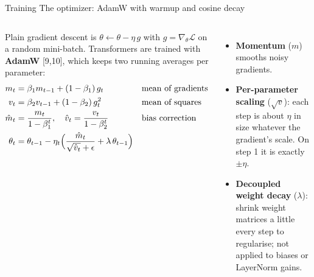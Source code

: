 \documentclass[aspectratio=169,10pt]{beamer}
\renewcommand{\cite}[1]{{\scriptsize\color{cTok}[#1]}}
\newcommand{\key}[1]{\textbf{\color{cAtt}#1}}
\begin{document}
\begin{frame}{Training \textbullet{} The optimizer: AdamW with warmup and cosine decay}
\begin{columns}[T,onlytextwidth]
\small
Plain gradient descent is $\theta\leftarrow\theta-\eta\,g$ with $g=\nabla_\theta\mathcal L$ on a random
mini-batch. Transformers are trained with \key{AdamW} \cite{9,10}, which keeps two running averages
per parameter:
\vspace{-1mm}
\begin{align*}
 m_t &= \beta_1 m_{t-1}+(1-\beta_1)\,g_t && \text{mean of gradients}\\
 v_t &= \beta_2 v_{t-1}+(1-\beta_2)\,g_t^{2} && \text{mean of squares}\\
 \hat m_t &= \frac{m_t}{1-\beta_1^{t}},\quad \hat v_t=\frac{v_t}{1-\beta_2^{t}} && \text{bias correction}\\
 \theta_t &= \theta_{t-1}-\eta_t\Bigl(\frac{\hat m_t}{\sqrt{\hat v_t}+\epsilon}+\lambda\,\theta_{t-1}\Bigr)
\end{align*}
\vspace{-3mm}
\begin{itemize}\footnotesize
  \item \textbf{Momentum} ($m$) smooths noisy gradients.
  \item \textbf{Per-parameter scaling} ($\sqrt{v}$): each step is about $\eta$ in size whatever the
        gradient's scale. On step 1 it is exactly $\pm\eta$.
  \item \textbf{Decoupled weight decay} ($\lambda$): shrink weight matrices a little every step
        to regularise; not applied to biases or LayerNorm gains.
\end{itemize}
\centering
{}


\end{columns}
\end{frame}
\end{document}
